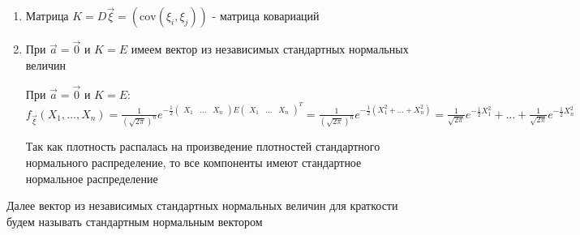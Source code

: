 \documentclass[12pt]{article}
\begin{document}
\begin{enumerate}
    \item Матрица $K = D \vec \xi = \left(\mathrm{cov} (\xi_i, \xi_j)\right)$ - матрица ковариаций

    \item При $\vec a = \vec 0$ и $K = E$ имеем вектор из независимых стандартных нормальных величин

    \begin{MyProof}
        При $\vec a = \vec 0$ и $K = E$: $f_{\vec \xi} (X_1, \dots, X_n) = \frac{1}{\left(\sqrt{2\pi}\right)^n} 
        e^{-\frac{1}{2} \begin{pmatrix}X_1 & \dots & X_n\end{pmatrix} E \begin{pmatrix}X_1 & \dots & X_n\end{pmatrix}^T} = 
        \frac{1}{\left(\sqrt{2\pi}\right)^n} e^{-\frac{1}{2} (X_1^2 + \dots + X_n^2)} = 
        \frac{1}{\sqrt{2\pi}} e^{-\frac{1}{2} X_1^2} + \dots + \frac{1}{\sqrt{2\pi}} e^{-\frac{1}{2} X_n^2}$

        Так как плотность распалась на произведение плотностей стандартного нормального распределение, то все компоненты имеют стандартное нормальное распределение
    \end{MyProof}
\end{enumerate}

Далее вектор из независимых стандартных нормальных величин для краткости будем называть стандартным нормальным вектором
\end{document}

